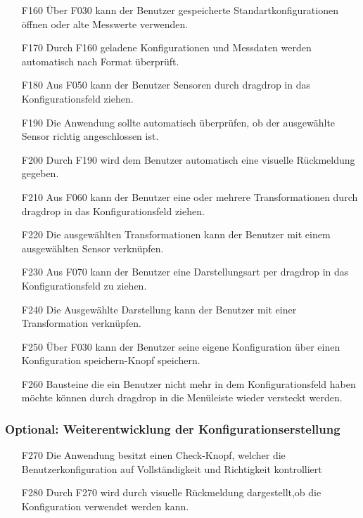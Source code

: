 \documentclass[parskip=full]{scrartcl}
\begin{document}
\begin{itemize}

\item[F160] Über F030 kann der Benutzer gespeicherte Standartkonfigurationen öffnen oder alte Messwerte verwenden.
\item[F170] Durch F160 geladene Konfigurationen und Messdaten werden automatisch nach Format überprüft.
\item[F180] Aus F050 kann der Benutzer Sensoren durch \gls{dragdrop} in das Konfigurationsfeld ziehen.
\item[F190] Die Anwendung sollte automatisch überprüfen, ob der ausgewählte Sensor richtig angeschlossen ist.
\item[F200] Durch F190 wird dem Benutzer automatisch eine visuelle Rückmeldung gegeben.
\item[F210] Aus F060 kann der Benutzer eine oder mehrere Transformationen durch \gls{dragdrop} in das Konfigurationsfeld ziehen.
\item[F220] Die ausgewählten Transformationen kann der Benutzer mit einem ausgewählten Sensor verknüpfen.
\item[F230] Aus F070 kann der Benutzer eine Darstellungsart per \gls{dragdrop} in das Konfigurationsfeld zu ziehen.
\item[F240] Die Ausgewählte Darstellung kann der Benutzer mit einer Transformation verknüpfen.
\item[F250] Über F030 kann der Benutzer seine eigene Konfiguration über einen Konfiguration speichern-Knopf speichern.
\item[F260] Bausteine die ein Benutzer nicht mehr in dem Konfigurationsfeld haben möchte können durch \gls{dragdrop} in die Menüleiste wieder versteckt werden.

\end{itemize}

\subsubsection{Optional: Weiterentwicklung der Konfigurationserstellung}

\begin{itemize}

\item[F270] Die Anwendung besitzt einen Check-Knopf, welcher die \gls{Benutzerkonfiguration} auf Vollständigkeit und Richtigkeit kontrolliert
\item[F280] Durch F270 wird durch visuelle Rückmeldung dargestellt,ob die Konfiguration verwendet werden kann.

\end{itemize}
\end{document}
